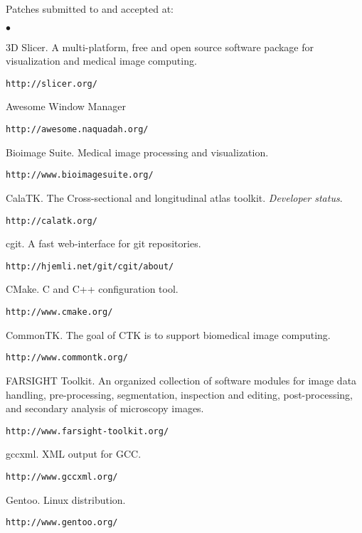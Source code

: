 \documentclass[margin,line]{res}
\newenvironment{list2}{
  \begin{list}{$\bullet$}{%
      \setlength{\itemsep}{0in}
      \setlength{\parsep}{0in} \setlength{\parskip}{0in}
      \setlength{\topsep}{0in} \setlength{\partopsep}{0in}
      \setlength{\leftmargin}{0.2in}}}{\end{list}}
\begin{document}
\begin{resume}
Patches submitted to and accepted at:
\begin{list2}
\item 3D Slicer.  A multi-platform, free and open source software package for
  visualization and medical image computing.
  \begin{verbatim}http://slicer.org/\end{verbatim}
\item Awesome Window Manager
  \begin{verbatim}http://awesome.naquadah.org/\end{verbatim}
\item Bioimage Suite.  Medical image processing and visualization.
  \begin{verbatim}http://www.bioimagesuite.org/\end{verbatim}
\item CalaTK.  The Cross-sectional and longitudinal atlas toolkit.  \textit{Developer status}.
  \begin{verbatim}http://calatk.org/\end{verbatim}
\item cgit. A fast web-interface for git repositories.
  \begin{verbatim}http://hjemli.net/git/cgit/about/\end{verbatim}
\item CMake.  C and C++ configuration tool.
  \begin{verbatim}http://www.cmake.org/\end{verbatim}
\item CommonTK.  The goal of CTK is to support biomedical image computing.
  \begin{verbatim}http://www.commontk.org/\end{verbatim}
\item FARSIGHT Toolkit.  An organized collection of software modules for image
  data handling, pre-processing, segmentation, inspection and editing,
  post-processing, and secondary analysis of microscopy images.
  \begin{verbatim}http://www.farsight-toolkit.org/\end{verbatim}
\item gccxml.  XML output for GCC.
  \begin{verbatim}http://www.gccxml.org/\end{verbatim}
\item Gentoo.  Linux distribution.
  \begin{verbatim}http://www.gentoo.org/\end{verbatim}

\end{list2}
\end{resume}
\end{document}
